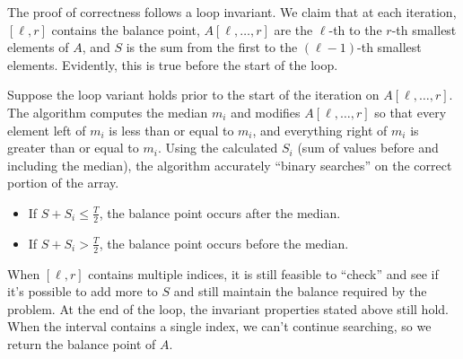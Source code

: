 \documentclass[11pt]{article}
\DeclarePairedDelimiter\floor{\lfloor}{\rfloor}
\begin{document}
\IncMargin{2em}
\begin{algorithm}[H]
    \footnotesize
    \BlankLine
\end{algorithm}\DecMargin{2em} 

The proof of correctness follows a loop invariant. We claim that at each iteration, $[\ell, r]$ contains the balance point, $A[\ell, \dots, r]$ are the $\ell$-th to the $r$-th smallest elements of $A$, and $S$ is the sum from the first to the $(\ell - 1)$-th smallest elements. Evidently, this is true before the start of the loop.

Suppose the loop variant holds prior to the start of the iteration on $A[\ell, \dots, r]$. The algorithm computes the median $m_i$ and modifies $A[\ell, \dots, r]$ so that every element left of $m_i$ is less than or equal to $m_i$, and everything right of $m_i$ is greater than or equal to $m_i$. Using the calculated $S_i$ (sum of values before and including the median), the algorithm accurately ``binary searches'' on the correct portion of the array.
\begin{itemize}
    \item If $S + S_i \leq \frac{T}{2}$, the balance point occurs after the median.
    \item If $S + S_i > \frac{T}{2}$, the balance point occurs before the median.
\end{itemize}
When $[\ell, r]$ contains multiple indices, it is still feasible to ``check'' and see if it's possible to add more to $S$ and still maintain the balance required by the problem. At the end of the loop, the invariant properties stated above still hold. When the interval contains a single index, we can't continue searching, so we return the balance point of $A$. 
\end{document}
